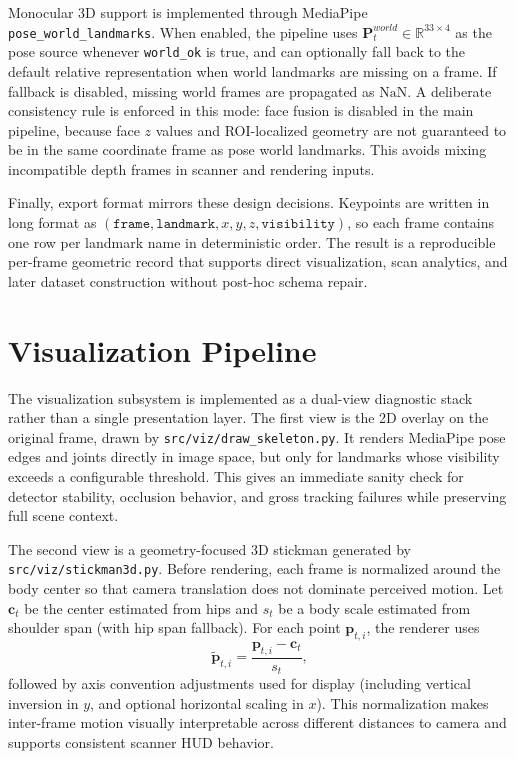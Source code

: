 \documentclass[11pt,a4paper]{article}
\begin{document}
Monocular 3D support is implemented through MediaPipe \texttt{pose\_world\_landmarks}. When enabled, the pipeline uses \(\mathbf{P}^{world}_t \in \mathbb{R}^{33 \times 4}\) as the pose source whenever \texttt{world\_ok} is true, and can optionally fall back to the default relative representation when world landmarks are missing on a frame. If fallback is disabled, missing world frames are propagated as \(\mathrm{NaN}\). A deliberate consistency rule is enforced in this mode: face fusion is disabled in the main pipeline, because face \(z\) values and ROI-localized geometry are not guaranteed to be in the same coordinate frame as pose world landmarks. This avoids mixing incompatible depth frames in scanner and rendering inputs.

Finally, export format mirrors these design decisions. Keypoints are written in long format as \((\texttt{frame},\texttt{landmark},x,y,z,\texttt{visibility})\), so each frame contains one row per landmark name in deterministic order. The result is a reproducible per-frame geometric record that supports direct visualization, scan analytics, and later dataset construction without post-hoc schema repair.

\section{Visualization Pipeline}
The visualization subsystem is implemented as a dual-view diagnostic stack rather than a single presentation layer. The first view is the 2D overlay on the original frame, drawn by \texttt{src/viz/draw\_skeleton.py}. It renders MediaPipe pose edges and joints directly in image space, but only for landmarks whose visibility exceeds a configurable threshold. This gives an immediate sanity check for detector stability, occlusion behavior, and gross tracking failures while preserving full scene context.

The second view is a geometry-focused 3D stickman generated by \texttt{src/viz/stickman3d.py}. Before rendering, each frame is normalized around the body center so that camera translation does not dominate perceived motion. Let \(\mathbf{c}_t\) be the center estimated from hips and \(s_t\) be a body scale estimated from shoulder span (with hip span fallback). For each point \(\mathbf{p}_{t,i}\), the renderer uses
\[
\tilde{\mathbf{p}}_{t,i} = \frac{\mathbf{p}_{t,i}-\mathbf{c}_t}{s_t},
\]
followed by axis convention adjustments used for display (including vertical inversion in \(y\), and optional horizontal scaling in \(x\)). This normalization makes inter-frame motion visually interpretable across different distances to camera and supports consistent scanner HUD behavior.
\end{document}
